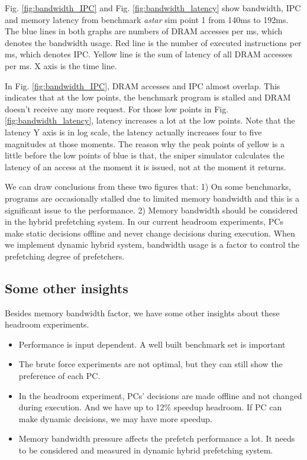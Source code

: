 Fig. \ref{fig:bandwidth_IPC} and Fig. \ref{fig:bandwidth_latency} show bandwidth, IPC and memory latency from benchmark \emph{astar} sim point 1 from 140ms to 192ms. The blue lines in both graphs are numbers of DRAM accesses per ms, which denotes the bandwidth usage. Red line is the number of executed instructions per ms, which denotes IPC. Yellow line is the sum of latency of all DRAM accesses per ms. X axis is the time line.\par
In Fig. \ref{fig:bandwidth_IPC}, DRAM accesses and IPC almost overlap. This indicates that at the low points, the benchmark program is stalled and DRAM doesn't receive any more request. For those low points in Fig. \ref{fig:bandwidth_latency}, latency increases a lot at the low points. Note that the latency Y axis is in log scale, the latency actually increases four to five magnitudes at those moments. The reason why the peak points of yellow is a little before the low points of blue is that, the sniper simulator calculates the latency of an access at the moment it is issued, not at the moment it returns.\par
 We can draw conclusions from these two figures that: 1) On some benchmarks, programs are occasionally stalled due to limited memory bandwidth and this is a significant issue to the performance. 2) Memory bandwidth should be considered in the hybrid prefetching system.  In our current headroom experiments, PCs make static decisions offline and never change decisions during execution. When we implement dynamic hybrid system, bandwidth usage is a factor to control the prefetching degree of prefetchers. \par


  \subsection{Some other insights}
  \label{sec:otherinsights}
  Besides memory bandwidth factor, we have some other insights about these headroom experiments.
  \begin{itemize}
    \item Performance is input dependent. A well built benchmark set is important
    \item The brute force experiments are not optimal, but they can still show the preference of each PC.
    \item In the headroom experiment, PCs’ decisions are made offline and not changed during execution. And we have up to 12\% speedup headroom. If PC can make dynamic decisions, we may have more speedup.
    \item Memory bandwidth pressure affects the prefetch performance a lot. It needs to be considered and measured in dynamic hybrid prefetching system.
  \end{itemize}
